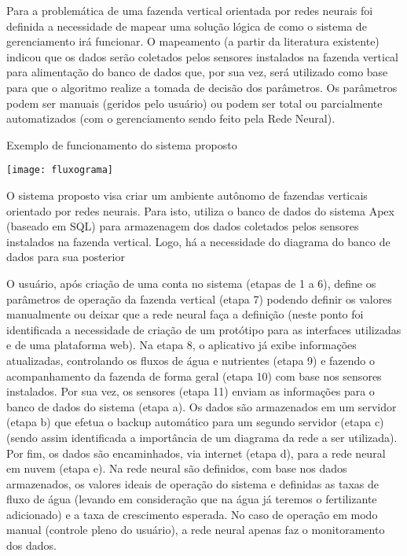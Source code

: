 Para a problemática de uma fazenda vertical orientada por redes neurais foi definida a necessidade de mapear uma solução lógica de como o sistema de gerenciamento irá funcionar. O mapeamento (a partir da literatura existente) indicou que os dados serão coletados pelos sensores instalados na fazenda vertical para alimentação do banco de dados que, por sua vez, será utilizado como base para que o algoritmo realize a tomada de decisão dos parâmetros. Os parâmetros podem ser manuais (geridos pelo usuário) ou podem ser total ou parcialmente automatizados (com o gerenciamento sendo feito pela Rede Neural).

\begin{flowchart}[!htb]
    \centering
    \caption{Exemplo de funcionamento do sistema proposto}%
    \label{fcht:fluxograma}
    \texttt{[image: fluxograma]}
    \end{flowchart}

O sistema proposto visa criar um ambiente autônomo de fazendas verticais orientado por redes neurais. Para isto, utiliza o banco de dados do sistema Apex (baseado em SQL) para armazenagem dos dados coletados pelos sensores instalados na fazenda vertical. Logo, há a necessidade do diagrama do banco de dados para sua posterior

O usuário, após criação de uma conta no sistema (etapas de 1 a 6), define os parâmetros de operação da fazenda vertical (etapa 7) podendo definir os valores manualmente ou deixar que a rede neural faça a definição (neste ponto foi identificada a necessidade de criação de um protótipo para as interfaces utilizadas e de uma plataforma web). Na etapa 8, o aplicativo já exibe informações atualizadas, controlando os fluxos de água e nutrientes (etapa 9) e fazendo o acompanhamento da fazenda de forma geral (etapa 10) com base nos sensores instalados. Por sua vez, os sensores (etapa 11) enviam as informações para o banco de dados do sistema (etapa a). Os dados são armazenados em um servidor (etapa b) que efetua o backup automático para um segundo servidor (etapa c) (sendo assim identificada a importância de um diagrama da rede a ser utilizada). Por fim, os dados são encaminhados, via internet (etapa d), para a rede neural em nuvem (etapa e). Na rede neural são definidos, com base nos dados armazenados, os valores ideais de operação do sistema e definidas as taxas de fluxo de água (levando em consideração que na água já teremos o fertilizante adicionado) e a taxa de crescimento esperada. No caso de operação em modo manual (controle pleno do usuário), a rede neural apenas faz o monitoramento dos dados.

